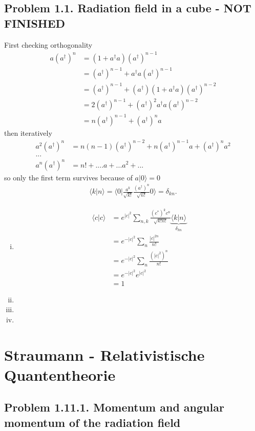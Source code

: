 \documentclass[10pt,a4paper]{book}
\theoremstyle{definition}
\begin{document}
\subsection{Problem 1.1. Radiation field in a cube - NOT FINISHED}
First checking orthogonality
\begin{align}
a(a^\dagger)^n
&=(1+a^\dagger a)(a^\dagger)^{n-1}\\
&=(a^\dagger)^{n-1}+a^\dagger a(a^\dagger)^{n-1}\\
&=(a^\dagger)^{n-1}+(a^\dagger)(1+a^\dagger a)(a^\dagger)^{n-2}\\
&=2(a^\dagger)^{n-1}+(a^\dagger)^2a^\dagger a(a^\dagger)^{n-2}\\
&=n(a^\dagger)^{n-1}+(a^\dagger)^{n}a
\end{align}
then iteratively
\begin{align}
a^2(a^\dagger)^n&=n(n-1)(a^\dagger)^{n-2}+n(a^\dagger)^{n-1}a+(a^\dagger)^na^2\\
...&\\
a^n(a^\dagger)^n&=n!+....a+...a^2+...
\end{align}
so only the first term survives because of $a|0\rangle=0$ 
\begin{align}
\langle k|n\rangle=\langle 0|\frac{a^k}{\sqrt{k!}}\frac{(a^\dagger)^n}{\sqrt{n!}}0\rangle=\delta_{kn}.
\end{align}

\begin{enumerate}[(i)]
\item
\begin{align}
\langle c|c\rangle
&=e^{|c|^2}\sum_{n,k}\frac{(c^*)^kc^n}{\sqrt{k!n!}}\underbrace{\langle k|n\rangle}_{\delta_{kn}}\\
&=e^{-|c|^2}\sum_{n}\frac{|c|^{2n}}{n!}\\
&=e^{-|c|^2}\sum_{n}\frac{(|c|^2)^n}{n!}\\
&=e^{-|c|^2}e^{|c|^2}\\
&=1
\end{align}
\item
\item
\item


\end{enumerate}


\section{{\sc Straumann} - Relativistische Quantentheorie} 
\subsection{Problem 1.11.1. Momentum and angular momentum of the radiation field}
\end{document}
